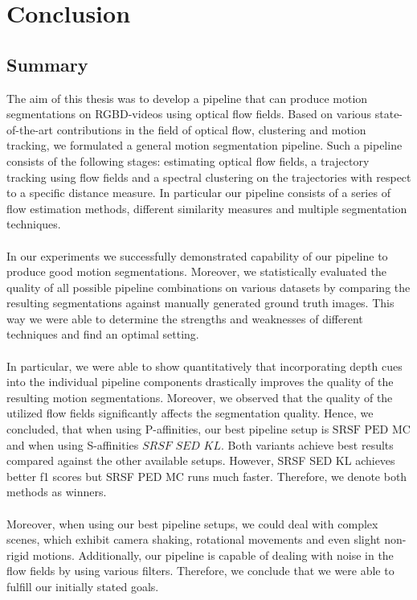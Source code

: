\chapter{Conclusion}
\section{Summary}
The aim of this thesis was to develop a pipeline that can produce motion segmentations on RGBD-videos using optical flow fields. Based on various state-of-the-art contributions in the field of optical flow, clustering and motion tracking, we formulated a general motion segmentation pipeline. Such a pipeline consists of the following stages: estimating optical flow fields, a trajectory tracking using flow fields and a spectral clustering on the trajectories with respect to a specific distance measure. In particular our pipeline consists of a series of flow estimation methods, different similarity measures and multiple segmentation techniques. \\ \\ 
In our experiments we successfully demonstrated capability of our pipeline to produce good motion segmentations. Moreover, we statistically evaluated the quality of all possible pipeline combinations on various datasets by comparing the resulting segmentations against manually generated ground truth images. This way we were able to determine the strengths and weaknesses of different techniques and find an optimal setting. \\ \\
In particular, we were able to show quantitatively that incorporating depth cues into the individual pipeline components drastically improves the quality of the resulting motion segmentations. Moreover, we observed that the quality of the utilized flow fields significantly affects the segmentation quality. Hence, we concluded, that when using P-affinities, our best pipeline setup is $\text{SRSF PED MC}$ and when using S-affinities $\textit{SRSF SED KL}$. Both variants achieve best results compared against the other available setups. However, SRSF SED KL achieves better f1 scores but SRSF PED MC runs much faster. Therefore, we denote both methods as winners.  \\ \\
Moreover, when using our best pipeline setups, we could deal with complex scenes, which exhibit camera shaking, rotational movements and even slight non-rigid motions. Additionally, our pipeline is capable of dealing with noise in the flow fields by using various filters. Therefore, we conclude that we were able to fulfill our initially stated goals. \\ \\
